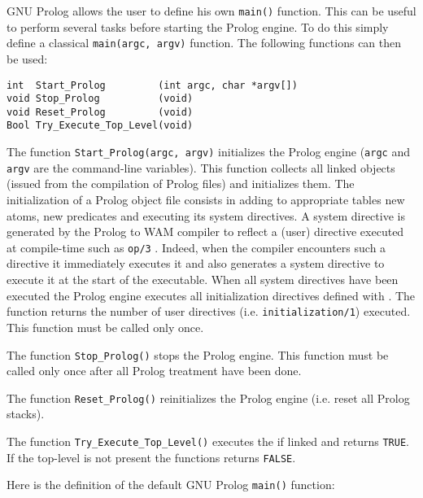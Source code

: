 GNU Prolog allows the user to define his own \texttt{main()}
function. This can be useful to perform several tasks before starting
the Prolog engine. To do this simply define a classical
\texttt{main(argc, argv)} function. The following functions can then be used:

\begin{Indentation}
\begin{verbatim}
int  Start_Prolog         (int argc, char *argv[])
void Stop_Prolog          (void)
void Reset_Prolog         (void)
Bool Try_Execute_Top_Level(void)
\end{verbatim}
\end{Indentation}

The function \texttt{Start\_Prolog(argc, argv)} initializes the Prolog engine
(\texttt{argc} and \texttt{argv} are the command-line variables). This
function collects all linked objects (issued from the compilation of Prolog
files) and initializes them. The initialization of a Prolog object file
consists in adding to appropriate tables new atoms, new predicates and
executing its system directives. A system directive is generated by the
Prolog to WAM compiler to reflect a (user) directive executed at compile-time
such as \texttt{op/3} . Indeed, when the compiler encounters
such a directive it immediately executes it and also generates a system
directive to execute it at the start of the executable.  When all system
directives have been executed the Prolog engine executes all initialization
directives defined with 
. The function returns the number of user
directives (i.e. \texttt{initialization/1}) executed. This function must be
called only once.

The function \texttt{Stop\_Prolog()} stops the Prolog engine. This function
must be called only once after all Prolog treatment have been done.

The function \texttt{Reset\_Prolog()} reinitializes the Prolog engine
(i.e. reset all Prolog stacks).

The function \texttt{Try\_Execute\_Top\_Level()} executes the
 if linked  and returns
\texttt{TRUE}. If the top-level is not present the functions returns
\texttt{FALSE}.

Here is the definition of the default GNU Prolog \texttt{main()} function:

